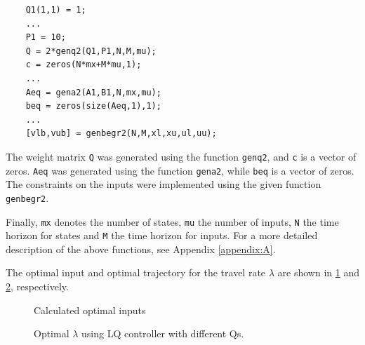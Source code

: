 \begin{lstlisting}
    Q1(1,1) = 1;
    ...
    P1 = 10;
    Q = 2*genq2(Q1,P1,N,M,mu);
    c = zeros(N*mx+M*mu,1);
    ...
    Aeq = gena2(A1,B1,N,mx,mu);
    beq = zeros(size(Aeq,1),1);
    ...
    [vlb,vub] = genbegr2(N,M,xl,xu,ul,uu);
\end{lstlisting}
The weight matrix \texttt{Q} was generated using the function \texttt{genq2}, and \texttt{c} is a vector of zeros. \texttt{Aeq} was generated using the function \texttt{gena2}, while \texttt{beq} is a vector of zeros. The constraints on the inputs were implemented using the given function \texttt{genbegr2}.

Finally, \texttt{mx} denotes the number of states, \texttt{mu} the number of inputs, \texttt{N} the time horizon for states and \texttt{M} the time horizon for inputs. For a more detailed description of the above functions, see Appendix \cref{appendix:A}.

The optimal input and optimal trajectory for the travel rate $\lambda$ are shown in \cref{fig:optimal_inputs} and \cref{fig:optimal_lambda}, respectively.

\begin{figure}[h]
    \centering
    \caption{Calculated optimal inputs}
    \label{fig:optimal_inputs}
\end{figure}

\begin{figure}[H]
    \centering
    \caption{Optimal $\lambda$ using LQ controller with different Qs.}
    \label{fig:optimal_lambda}
\end{figure}

